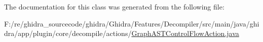 The documentation for this class was generated from the following file\+:\begin{DoxyCompactItemize}
\item 
F\+:/re/ghidra\+\_\+sourcecode/ghidra/\+Ghidra/\+Features/\+Decompiler/src/main/java/ghidra/app/plugin/core/decompile/actions/\mbox{\hyperlink{_graph_a_s_t_control_flow_action_8java}{Graph\+A\+S\+T\+Control\+Flow\+Action.\+java}}\end{DoxyCompactItemize}
